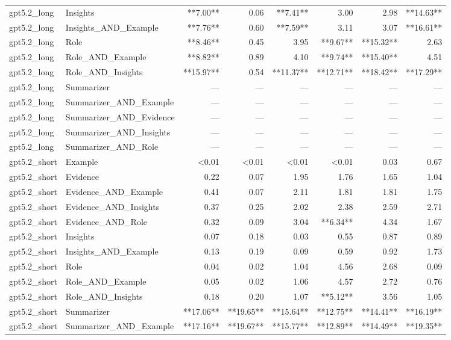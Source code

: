 \begin{tabular}{llrrrrrr}
gpt5.2_long & Insights & **7.00** & 0.06 & **7.41** & 3.00 & 2.98 & **14.63** \\
gpt5.2_long & Insights_AND_Example & **7.76** & 0.60 & **7.59** & 3.11 & 3.07 & **16.61** \\
gpt5.2_long & Role & **8.46** & 0.45 & 3.95 & **9.67** & **15.32** & 2.63 \\
gpt5.2_long & Role_AND_Example & **8.82** & 0.89 & 4.10 & **9.74** & **15.40** & 4.51 \\
gpt5.2_long & Role_AND_Insights & **15.97** & 0.54 & **11.37** & **12.71** & **18.42** & **17.29** \\
gpt5.2_long & Summarizer & — & — & — & — & — & — \\
gpt5.2_long & Summarizer_AND_Example & — & — & — & — & — & — \\
gpt5.2_long & Summarizer_AND_Evidence & — & — & — & — & — & — \\
gpt5.2_long & Summarizer_AND_Insights & — & — & — & — & — & — \\
gpt5.2_long & Summarizer_AND_Role & — & — & — & — & — & — \\
gpt5.2_short & Example & <0.01 & <0.01 & <0.01 & <0.01 & 0.03 & 0.67 \\
gpt5.2_short & Evidence & 0.22 & 0.07 & 1.95 & 1.76 & 1.65 & 1.04 \\
gpt5.2_short & Evidence_AND_Example & 0.41 & 0.07 & 2.11 & 1.81 & 1.81 & 1.75 \\
gpt5.2_short & Evidence_AND_Insights & 0.37 & 0.25 & 2.02 & 2.38 & 2.59 & 2.71 \\
gpt5.2_short & Evidence_AND_Role & 0.32 & 0.09 & 3.04 & **6.34** & 4.34 & 1.67 \\
gpt5.2_short & Insights & 0.07 & 0.18 & 0.03 & 0.55 & 0.87 & 0.89 \\
gpt5.2_short & Insights_AND_Example & 0.13 & 0.19 & 0.09 & 0.59 & 0.92 & 1.73 \\
gpt5.2_short & Role & 0.04 & 0.02 & 1.04 & 4.56 & 2.68 & 0.09 \\
gpt5.2_short & Role_AND_Example & 0.05 & 0.02 & 1.06 & 4.57 & 2.72 & 0.76 \\
gpt5.2_short & Role_AND_Insights & 0.18 & 0.20 & 1.07 & **5.12** & 3.56 & 1.05 \\
gpt5.2_short & Summarizer & **17.06** & **19.65** & **15.64** & **12.75** & **14.41** & **16.19** \\
gpt5.2_short & Summarizer_AND_Example & **17.16** & **19.67** & **15.77** & **12.89** & **14.49** & **19.35** \\

\end{tabular}
